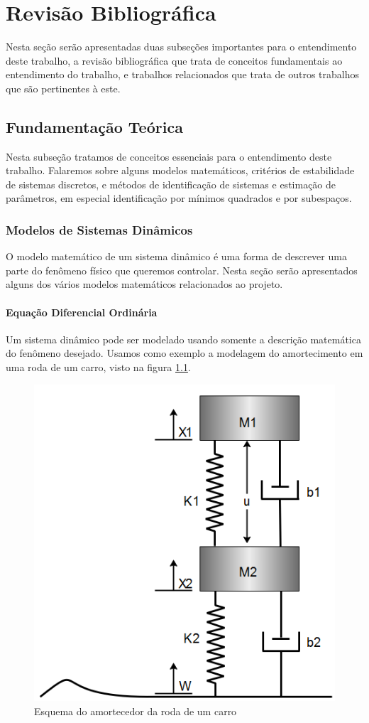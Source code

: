 \chapter{Revisão Bibliográfica} \label{cap2}
Nesta seção serão apresentadas duas subseções importantes para o entendimento deste trabalho, a revisão bibliográfica que trata de conceitos fundamentais ao entendimento do trabalho, e trabalhos relacionados que trata de outros trabalhos que são pertinentes à este.
	
\section{Fundamentação Teórica}
Nesta subseção tratamos de conceitos essenciais para o entendimento deste trabalho. Falaremos sobre alguns modelos matemáticos, critérios de estabilidade de sistemas discretos, e métodos de identificação de sistemas e estimação de parâmetros, em especial identificação por mínimos quadrados e por subespaços.


\subsection{Modelos de Sistemas Dinâmicos}\label{capA}
O modelo matemático de um sistema dinâmico é uma forma de descrever uma parte do fenômeno físico que queremos controlar. Nesta seção serão apresentados alguns dos vários modelos matemáticos relacionados ao projeto.
\subsubsection{Equação Diferencial Ordinária}
Um sistema dinâmico pode ser modelado usando somente a descrição matemática do fenômeno desejado. Usamos como exemplo a modelagem do amortecimento em uma roda de um carro, visto na figura \ref{fig:modeloamortecimento}.

\begin{figure}
	\centering
	\includegraphics[width=0.5\linewidth]{modelo_amortecimento}
	\caption{Esquema do amortecedor da roda de um carro}
	\label{fig:modeloamortecimento}
\end{figure}

